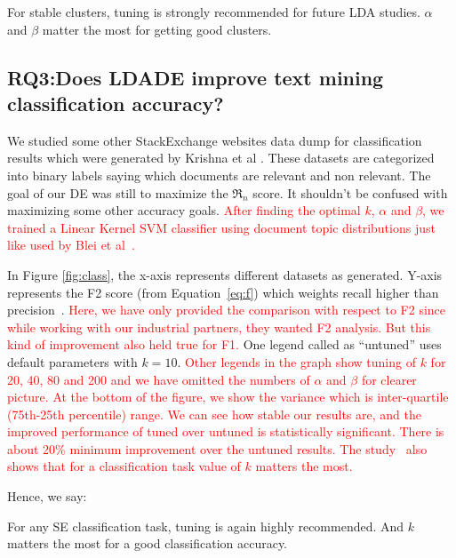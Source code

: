 \documentclass[twocolumn,5p,sort&compress]{elsarticle}
\newcommand{\eq}[1]{Equation~\ref{eq:#1}}
\theoremstyle{break}
\begin{document}
\begin{lesson}
For stable clusters, tuning is strongly recommended for future LDA studies. $\alpha$ and $\beta$ matter the most for getting good clusters.
\end{lesson}

\subsection{\textbf{RQ3:Does LDADE improve text mining classification accuracy?}}\label{sect:rq3} 

We studied some other StackExchange websites data dump for classification results which were generated by Krishna et al \cite{krishna2016bigse}. These datasets are categorized into binary labels saying which documents are relevant and non relevant. The goal of our DE was still to maximize the $\Re_n$ score. It shouldn't be confused with maximizing some other accuracy goals. \textcolor{red}{After finding the optimal $k$, $\alpha$ and $\beta$, we trained a Linear Kernel SVM classifier using document topic distributions just like used by Blei et al~\cite{blei2003latent}.}

In Figure \ref{fig:class}, the x-axis represents different datasets as generated. Y-axis represents the F2 score
(from \eq{f}) which weights recall higher than precision~\cite{powers2011evaluation}.  \textcolor{red}{Here, we have only provided the comparison with respect to F2 since while working with our industrial partners, they wanted F2 analysis. But this kind of improvement also held true for F1.}  One legend called as ``untuned'' uses default parameters with $k=10$. \textcolor{red}{Other legends in the graph show tuning of $k$ for 20, 40, 80 and 200 and we have omitted the numbers of $\alpha$ and $\beta$ for clearer picture. At the bottom of the figure, we show the variance which is inter-quartile (75th-25th percentile) range. We can see how stable our results are, and the improved performance of tuned over untuned is statistically significant. There is about 20\% minimum improvement over the untuned results. The study~\cite{blei2003latent} also shows that for a classification task value of $k$ matters the most.} 

\noindent
Hence, we say:

\begin{lesson}
For any SE classification task, tuning is again highly recommended. And $k$ matters the most for a good classification accuracy.
\end{lesson}
\end{document}
